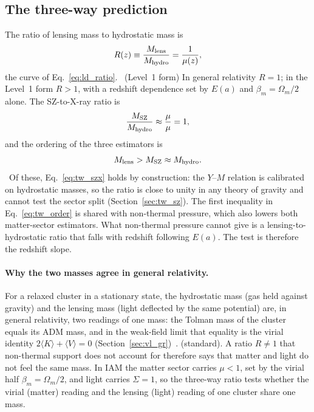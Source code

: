 \subsection{The three-way prediction}
The ratio of lensing mass to hydrostatic mass is
\begin{equation}
R(z)\equiv\frac{M_{\rm lens}}{M_{\rm hydro}}=\frac{1}{\mu(z)},
\label{eq:tw_R}\end{equation}
the curve of Eq.~\eqref{eq:ld_ratio}. \derived\ (Level~1 form) In general relativity $R=1$; in the Level~1 form $R>1$, with a redshift dependence set by
$E(a)$ and $\beta_m=\Omega_m/2$ alone. The SZ-to-X-ray ratio is
\begin{equation}
\frac{M_{\rm SZ}}{M_{\rm hydro}}\approx\frac{\mu}{\mu}=1,
\label{eq:tw_szx}\end{equation}
and the ordering of the three estimators is
\begin{equation}
M_{\rm lens}>M_{\rm SZ}\approx M_{\rm hydro}.
\label{eq:tw_order}\end{equation}
\calc\ Of these, Eq.~\eqref{eq:tw_szx} holds by construction: the $Y$--$M$ relation is calibrated on hydrostatic masses, so the ratio is close to unity
in any theory of gravity and cannot test the sector split (Section~\ref{sec:tw_sz}). The first inequality in Eq.~\eqref{eq:tw_order} is shared with
non-thermal pressure, which also lowers both matter-sector estimators. What non-thermal pressure cannot give is a lensing-to-hydrostatic ratio that
falls with redshift following $E(a)$. The test is therefore the redshift slope. \calc

\paragraph{Why the two masses agree in general relativity.} For a relaxed cluster in a stationary state, the hydrostatic mass (gas held
against gravity) and the lensing mass (light deflected by the same potential) are, in general relativity, two readings of one mass: the Tolman mass
of the cluster equals its ADM mass, and in the weak-field limit that equality is the virial identity $2\langle K\rangle+\langle V\rangle=0$
(Section~\ref{sec:vl_gr})~\cite{Tolman1930,GourgoulhonBonazzola1994}. \derived{} (standard). A ratio $R\ne1$ that non-thermal support does not
account for therefore says that matter and light do not feel the same mass. In IAM the matter sector carries $\mu<1$, set by the virial half
$\beta_m=\Omega_m/2$, and light carries $\Sigma=1$, so the three-way ratio tests whether the virial (matter) reading and the lensing (light)
reading of one cluster share one mass. \interp

